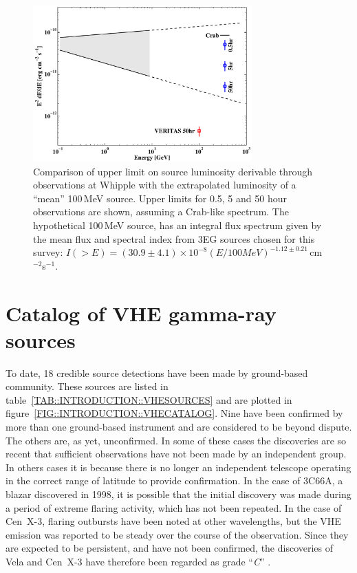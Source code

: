 \begin{figure}[p]
\centerline{\includegraphics[angle=270,width=0.75\textwidth]{plots/chap-introduction/sensitivity_VHE_3eg_VERITAS.pdf}}
\caption{\label{FIG::INTRODUCTION::SENSITIVITY} 
Comparison of upper limit on source luminosity derivable through
observations at Whipple with the extrapolated luminosity of a ``mean''
100\,MeV source. Upper limits for 0.5, 5 and 50 hour observations are
shown, assuming a Crab-like spectrum. The hypothetical 100\,MeV
source, has an integral flux spectrum given by the mean flux and
spectral index from 3EG sources chosen for this survey:
$I(>E)=(30.9\pm4.1)\times10^{-8}(E/100MeV)^{-1.12\pm0.21}$\,cm$^{-2}$s$^{-1}$.}
\end{figure}

\section{Catalog of VHE gamma-ray sources}
\label{SEC::INTRODUCTION::VHECATALOG}

To date, 18 credible source detections have been made by ground-based
\Gray community. These sources are listed in
table~\ref{TAB::INTRODUCTION::VHESOURCES} and are plotted in
figure~\ref{FIG::INTRODUCTION::VHECATALOG}. Nine have been confirmed
by more than one ground-based instrument and are considered to be
beyond dispute. The others are, as yet, unconfirmed. In some of these
cases the discoveries are so recent that sufficient observations have
not been made by an independent group. In others cases it is because
there is no longer an independent telescope operating in the correct
range of latitude to provide confirmation. In the case of 3C66A, a
blazar discovered in 1998, it is possible that the initial discovery
was made during a period of extreme flaring activity, which has not
been repeated. In the case of Cen~X-3, flaring outbursts have been
noted at other wavelengths, but the VHE emission was reported to be
steady over the course of the observation. Since they are expected to
be persistent, and have not been confirmed, the discoveries of Vela
and Cen~X-3 have therefore been regarded as grade ``\textit{C}''
\citep{REF::HORAN_WEEKES::2NDVERITAS2004}.


